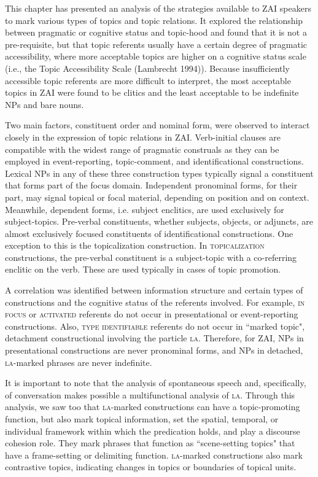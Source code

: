 This chapter has presented an analysis of the strategies available to ZAI speakers to mark various types of topics and topic relations. It explored the relationship between pragmatic or cognitive status and topic-hood and found that it is not a pre-requisite, but that topic referents usually have a certain degree of pragmatic accessibility, where more acceptable topics are higher on a cognitive status scale (i.e., the Topic Accessibility Scale (Lambrecht 1994)). Because insufficiently accessible topic referents are more difficult to interpret, the most acceptable topics in ZAI were found to be clitics and the least acceptable to be indefinite NPs and bare nouns.

Two main factors, constituent order and nominal form, were observed to interact closely in the expression of topic relations in ZAI. Verb-initial clauses are compatible with the widest range of pragmatic construals as they can be employed in event-reporting, topic-comment, and identificational constructions. Lexical NPs in any of these three construction types typically signal a constituent that forms part of the focus domain. Independent pronominal forms, for their part, may signal topical or focal material, depending on position and on context. Meanwhile, dependent forms, i.e. subject enclitics, are used exclusively for subject-topics. Pre-verbal constituents, whether subjects, objects, or adjuncts, are almost exclusively focused constituents of identificational constructions. One exception to this is the topicalization construction. In \textsc{topicalization} constructions, the pre-verbal constituent is a subject-topic with a co-referring enclitic on the verb. These are used typically in cases of topic promotion.

A correlation was identified between information structure and certain types of constructions and the cognitive status of the referents involved. For example, \textsc{in focus} \citep{gundel1993} or \textsc{activated} referents do not occur in presentational or event-reporting constructions. Also, \textsc{type identifiable} referents do not occur in ``marked topic", detachment constructional involving the particle \textsc{la}. Therefore, for ZAI, NPs in presentational constructions are never pronominal forms, and NPs in detached, \textsc{la}-marked phrases are never indefinite.

It is important to note that the analysis of spontaneous speech and, specifically, of conversation makes possible a multifunctional analysis of \textsc{la}. Through this analysis, we saw too that \textsc{la}-marked constructions can have a topic-promoting function, but also mark topical information, set the spatial, temporal, or individual framework within which the predication holds, and play a discourse cohesion role. They mark phrases that function as ``scene-setting topics" that have a frame-setting or delimiting function. \textsc{la}-marked constructions also mark contrastive topics, indicating changes in topics or boundaries of topical units. 

